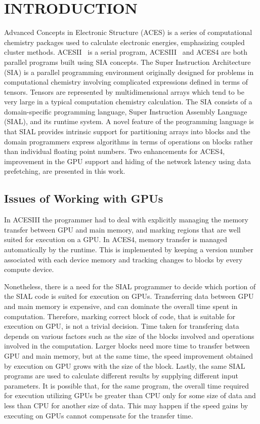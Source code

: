 \chapter{INTRODUCTION}\label{intro}
Advanced Concepts in Electronic Structure (ACES)
is a series of computational chemistry packages used to calculate electronic energies,
emphasizing coupled cluster methods. ACESII~\cite{doi:10.1002/qua.560440876} is a serial program, ACESIII~\cite{doi:10.1002/wcms.77} and ACES4 are
both parallel programs built using SIA concepts. The Super Instruction Architecture (SIA)\cite{Sanders:2010:BLR:1884643.1884677} is a parallel programming environment
originally designed for problems in computational chemistry involving complicated
expressions defined in terms of tensors. Tensors are represented by
multidimensional arrays which tend to be very large in a typical computation chemistry
calculation. The SIA consists of a
domain-specific programming language, Super Instruction Assembly Language
(SIAL), and its runtime system.
A novel feature of the programming language is that SIAL provides intrinsic support
for partitioning arrays into blocks and the domain programmers express
algorithms in terms of operations on blocks rather than individual floating point
numbers. Two enhancements for ACES4, improvement in the GPU support and hiding of the network
latency using data prefetching, are presented in this work.\\


\section{Issues of Working with GPUs}
In ACESIII\cite{Jindal2016} the programmer had to deal with explicitly managing
the memory transfer between GPU and main memory, and marking regions that are well suited for execution
on a GPU. In ACES4, memory transfer is managed automatically by the runtime.
This is implemented by keeping a version number associated with each device memory
and tracking changes to blocks by every compute device.

Nonetheless, there is a need for the SIAL programmer to decide which portion of the SIAL code
is suited for execution on GPUs. Transferring data between GPU and main memory is
expensive\cite{datatransferoptimization}, and can dominate the overall time spent in computation. Therefore, marking
correct block of code, that is suitable for execution on GPU, is not
a trivial decision. Time taken for transfering data depends on various factors such as
the size of the blocks involved and operations involved in the computation.
Larger blocks need more time to transfer between GPU and main memory, but at the
same time, the speed improvement obtained by execution on GPU grows
with the size of the block. Lastly, the same SIAL programs are used to
calculate different results by supplying different input parameters. It is possible that,
for the same program, the overall time required for execution utilizing GPUs be greater
than CPU only for some size of data and less than CPU for another size of data.
This may happen if the speed gains by executing on GPUs cannot compensate for the
transfer time.

